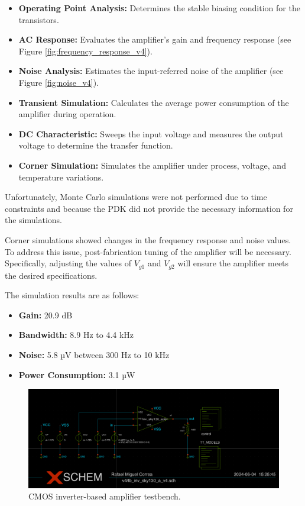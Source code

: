 \begin{itemize}
\item \textbf{Operating Point Analysis:} Determines the stable biasing condition for the transistors.
\item \textbf{AC Response:} Evaluates the amplifier's gain and frequency response (see Figure \ref{fig:frequency_response_v4}).
\item \textbf{Noise Analysis:} Estimates the input-referred noise of the amplifier (see Figure \ref{fig:noise_v4}).
\item \textbf{Transient Simulation:} Calculates the average power consumption of the amplifier during operation.
\item \textbf{DC Characteristic:} Sweeps the input voltage and measures the output voltage to determine the transfer function.
\item \textbf{Corner Simulation:} Simulates the amplifier under process, voltage, and temperature variations.
\end{itemize}

Unfortunately, Monte Carlo simulations were not performed due to time constraints and because the PDK did not provide the necessary information for the simulations.

Corner simulations showed changes in the frequency response and noise values. To address this issue, post-fabrication tuning of the amplifier will be necessary. 
Specifically, adjusting the values of $V_{g1}$ and $V_{g2}$ will ensure the amplifier meets the desired specifications.

The simulation results are as follows:

\begin{itemize}
\item \textbf{Gain:} 20.9 dB
\item \textbf{Bandwidth:} 8.9 Hz to 4.4 kHz
\item \textbf{Noise:} 5.8 µV between 300 Hz to 10 kHz
\item \textbf{Power Consumption:} 3.1 µW
\end{itemize}

\begin{figure}[ht!]
\centering
\includegraphics[width=\textwidth]{Figures/testbench.png}
\caption{CMOS inverter-based amplifier testbench.}
\label{fig:testbench_v4}
\end{figure}


